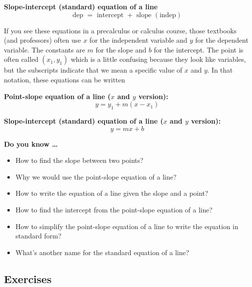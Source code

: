 \textbf{Slope-intercept (standard) equation of a line}
$$\text{dep } = \text{ intercept } + \text{ slope }(\text{indep})$$

If you see these equations in a precalculus or calculus course, those textbooks (and professors) often use $x$ for the independent variable and $y$ for the dependent variable. The constants are $m$ for the slope and $b$ for the intercept. The point is often called $(x_1,y_1)$ which is a little confusing because they look like variables, but the subscripts indicate that we mean a specific value of $x$ and $y$.  In that notation, these equations can be written

\textbf{Point-slope equation of a line ($x$ and $y$ version):}
$$y = y_1 + m(x-x_1)$$

\textbf{Slope-intercept (standard) equation of a line ($x$ and $y$ version):}
$$y = mx + b$$

 

\noindent \textbf{Do you know \ldots}

\begin{itemize}
\item How to find the slope between two points?
\item Why we would use the point-slope equation of a line?
\item How to write the equation of a line given the slope and a point?
\item How to find the intercept from the point-slope equation of a line?
\item How to simplify the point-slope equation of a line to write the equation in standard form?
\item What's another name for the standard equation of a line?
  
\end{itemize}

\subsection*{Exercises}

